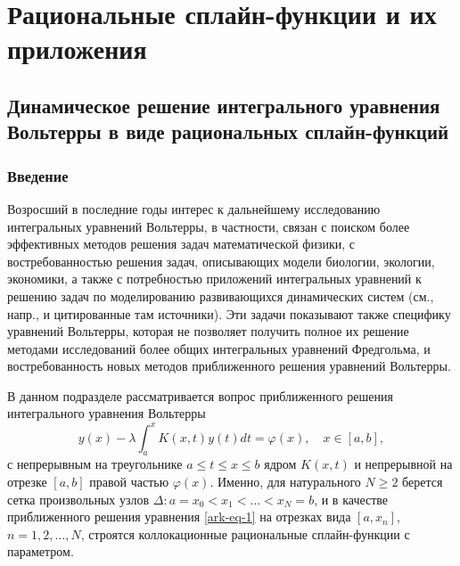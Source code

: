 \chapter{Рациональные сплайн-функции и их приложения}

\section{Динамическое решение интегрального уравнения Вольтерры в виде
рациональных сплайн-функций}
%

\subsection{Введение}

Возросший в последние годы интерес к дальнейшему исследованию интегральных уравнений
Вольтерры, в частности, связан с поиском более эффективных методов решения задач
математической физики, с востребованностью решения задач, описывающих модели
биологии, экологии, экономики, а также с потребностью приложений интегральных уравнений
к решению задач по моделированию развивающихся динамических систем (см., напр., \cite{ark-3}
и цитированные там источники). Эти задачи показывают также специфику
уравнений Вольтерры, которая не позволяет получить полное их решение методами
исследований более общих интегральных уравнений Фредгольма, и востребованность новых методов
приближенного решения уравнений Вольтерры.

В данном подразделе рассматривается вопрос приближенного решения интегрального уравнения
 Вольтерры
\begin{equation}\label{ark-eq-1}
y(x)-\lambda \int_a^x K(x,t)y(t) dt=\varphi(x),\quad x\in[a,b],
\end{equation}
с непрерывным на треугольнике $a\leqslant t\leqslant x\leqslant b$ ядром $K(x,t)$
и непрерывной на отрезке $[a,b]$ правой частью $\varphi(x)$. Именно, для натурального
$N\geqslant 2$ берется сетка произвольных узлов $\Delta:a=x_0<x_1<\dots <x_N=b$,  и
в качестве приближенного решения уравнения \eqref{ark-eq-1} на отрезках вида $[a,x_n]$,
$n=1,2,\dots,N$, строятся коллокационные рациональные сплайн-функции с параметром.

